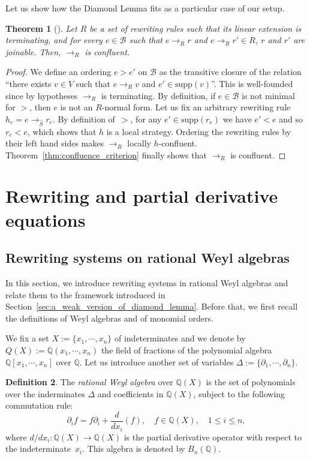 \documentclass[10pt]{easychair}
\newtheorem{theorem}{Theorem}[section]
\theoremstyle{definition}
\newtheorem{definition}[theorem]{Definition}
\newcommand\supp{\text{supp}}
\newcommand\diff[1]{\partial_{#1}}
\newcommand\basis{\mathscr{B}}
\newcommand\Q{\mathbb{Q}}
\newcommand\QX{\mathbb{Q}[x_1,\cdots,x_n]}
\newcommand\QXX{\mathbb{Q}(x_1,\cdots,x_n)}
\newcommand\Weyl{B_n(\Q)}
\newcommand\rewR{\to_R}
\newcommand\rewS{\to_{\hat{S}}}
\begin{document}
Let us show how the Diamond Lemma fits as a particular case of our setup.
\smallskip

\begin{theorem}[\cite{MR506890}]\label{thm:diamond_lemma}
  Let $R$ be a set of rewriting rules such that its linear extension is
  terminating, and for every $e\in\basis$ such that $e\rewR r$ and
  $e\rewR r'\in R$, $r$ and $r'$ are joinable. Then, $\rewR$ is
  confluent.
\end{theorem}

\begin{proof}
  We define an ordering $e>e'$ on $\basis$ as the transitive closure of
  the relation ``there exists $v\in V$ such that $e\rewR v$ and
  $e'\in\supp(v)$''. This is well-founded since by hypotheses $\rewR$ is
  terminating. By definition, if $e\in\basis$ is not minimal for $>$,
  then $e$ is not an $R$-normal form. Let us fix an arbitrary rewriting
  rule $h_e=e\rewS r_e$.  By definition of~$>$, for any $e'\in\supp(r_e)$
  we have $e'<e$ and so $r_e<e$, which shows that $h$ is a local
  strategy. Ordering the rewriting rules by their left hand sides makes
  $\rewR$ locally $h$-confluent. Theorem~\ref{thm:confluence_criterion}
  finally shows that $\rewR$ is confluent.   
\end{proof}

\section{Rewriting and partial derivative equations}
\label{sec:rewriting_systems_and_partial_derivative_equations}

\subsection{Rewriting systems on rational Weyl algebras}
\label{sec:rewriting_systems_on_Weyl_algebras}

In this section, we introduce rewriting systems in rational Weyl algebras
and relate them to the framework introduced in
Section~\ref{sec:a_weak_version_of_diamond_lemma}. Before that, we first
recall the definitions of Weyl algebras and of monomial orders.
\medskip

We fix a set $X:=\{x_1,\cdots,x_n\}$ of indeterminates and we denote by
$Q(X):=\QXX$ the field of fractions of the polynomial algebra $\QX$ over
$\Q$. Let us introduce another set of variables
$\Delta:=\{\diff{1},\cdots,\diff{n}\}$. 

\begin{definition}
  The {\it rational Weyl algebra} over $\Q(X)$ is the set of polynomials
  over the inderminates $\Delta$ and coefficients in $\Q(X)$, subject to
  the following commutation rule:
  \[\diff{i}f=f\diff{i}+\frac{d}{dx_i}(f),\quad f\in\Q(X),\quad
  1\leq i\leq n,\]
  where $d/dx_i:\Q(X)\to\Q(X)$ is the partial derivative operator with
  respect to the indeterminate~$x_i$. This algebra is denoted by $\Weyl$.
\end{definition}
\end{document}
